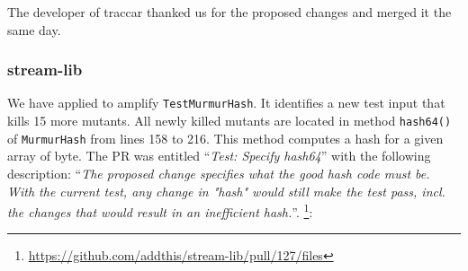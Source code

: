 The developer of traccar thanked us for the proposed changes and merged it the same day.


\subsubsection{stream-lib}



We have applied \dspot to amplify \texttt{TestMurmurHash}. It identifies a new test input that kills 15 more mutants.
All newly killed mutants are located in method \texttt{hash64()} of \texttt{MurmurHash} from lines 158 to 216. This method computes a hash for a given array of byte. The PR was entitled ``\emph{Test: Specify hash64}'' with the following description: ``\emph{The proposed change specifies what the good hash code must be. With the current test, any change in "hash" would still make the test pass, incl. the changes that would result in an inefficient hash.}''. \footnote{\url{https://github.com/addthis/stream-lib/pull/127/files}}:
\begin{figure}[H]
	\centering{}
\end{figure}

